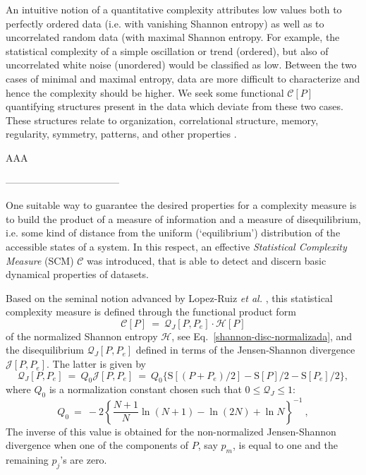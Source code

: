 An intuitive notion of a quantitative complexity attributes low values both to perfectly ordered data (i.e. with vanishing Shannon entropy) as well as to uncorrelated random data (with maximal Shannon entropy.
For example, the statistical complexity of a simple oscillation or trend (ordered), but also of uncorrelated white noise (unordered) would be classified as low.
Between the two cases of minimal and maximal entropy, data are more difficult to characterize and hence the complexity should be higher.
We seek some functional ${\mathcal C} [P]$ quantifying structures present in the data which deviate from these two cases.
These structures relate to organization, correlational structure, memory, regularity, symmetry, patterns, and other properties \cite{Feldman2008}.


AAA

-----------------------------------



One suitable way to guarantee the desired properties for a complexity measure is to build the product of a measure of information and a measure of
disequilibrium, i.e. some kind of distance from the uniform (`equilibrium') distribution of the accessible states of 
a system. In this respect, \cite{Lamberti2004} an effective {\it Statistical Complexity Measure\/} (SCM) ${\mathcal C}$ was introduced, that is able to detect and discern basic dynamical properties of datasets.

Based on the seminal notion advanced by Lopez-Ruiz {\it et al.\/} \cite{LMC1995}, this statistical complexity 
measure\cite{Martin2003,Lamberti2004} is defined through the functional product form
\begin{equation}
{\mathcal C}[P] ~=~ {\mathcal Q}_{J}[P,P_e] \cdot {\mathcal H}[P]
\label{complexity}
\end{equation}
of the normalized Shannon entropy ${\mathcal H}$, see Eq.~\eqref{shannon-disc-normalizada}, and the disequilibrium 
${\mathcal Q}_{J}[ P, P_e]$ defined in terms of the Jensen-Shannon divergence ${\mathcal J}[ P, P_e]$.
The latter is given by
\begin{equation}
\label{disequilibrium}
{\mathcal Q}_{J} [ P, P_e] ~=~ Q_{0} {\mathcal J}[ P, P_e] ~=~ 
Q_{0} \{ {\mathrm S}[(P + P_e)/2 ] - {\mathrm S}[ P ]/2 - {\mathrm S}[P_e]/2\},
\end{equation}
where $Q_0$ is a normalization constant chosen 
such that $0 \leq {\mathcal Q}_{J} \leq 1$:
\begin{equation}
Q_0 ~=~ -2 \left\{  {\frac{N+1}{N}}  \ln (N+1) - \ln (2N)  +  \ln N \right\}^{-1} \ ,
\label{q0-jensen-1}
\end{equation}
The inverse of this value is obtained for the non-normalized Jensen-Shannon divergence when one of the components of $P$, say $p_m$, is equal to one and the remaining $p_j$'s are zero.

